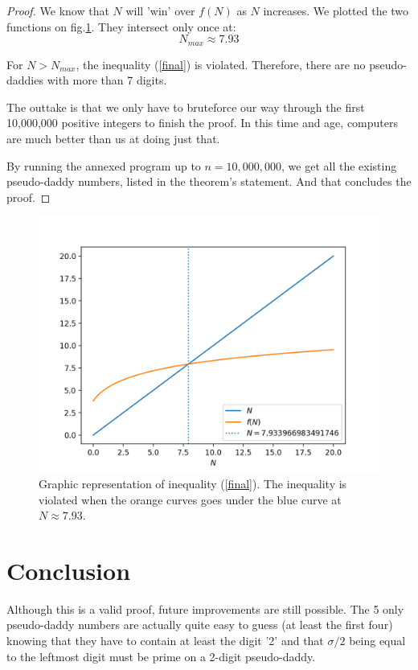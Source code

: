 \documentclass[a4paper, 11pt]{report}
\begin{document}
\begin{proof}
	We know that $N$ will 'win' over $f(N)$ as $N$ increases. We plotted the two functions on fig.\ref{plot}. They intersect only once at:
	$$N_{max}\approx7.93$$
	
	For $N> N_{max}$, the inequality (\ref{final}) is violated. Therefore, there are no pseudo-daddies with more than 7 digits.
	
	The outtake is that we only have to bruteforce our way through the first 10,000,000 positive integers to finish the proof. In this time and age, computers are much better than us at doing just that. 
	
	By running the annexed program up to $n=10,000,000$, we get all the existing pseudo-daddy numbers, listed in the theorem's statement. And that concludes the proof.
\end{proof}

\begin{figure}[htbp]
\begin{center}
	\includegraphics{plot.png}
\caption{Graphic representation of inequality (\ref{final}). The inequality is violated when the orange curves goes under the blue curve at $N\approx7.93$.}
\label{plot}
\end{center}
\end{figure}

\section{Conclusion}
	Although this is a valid proof, future improvements are still possible. The 5 only pseudo-daddy numbers are actually quite easy to guess (at least the first four) knowing that they have to contain at least the digit '2' and that $\sigma/2$ being equal to the leftmost digit must be prime on a 2-digit pseudo-daddy. 
	
\end{document}
